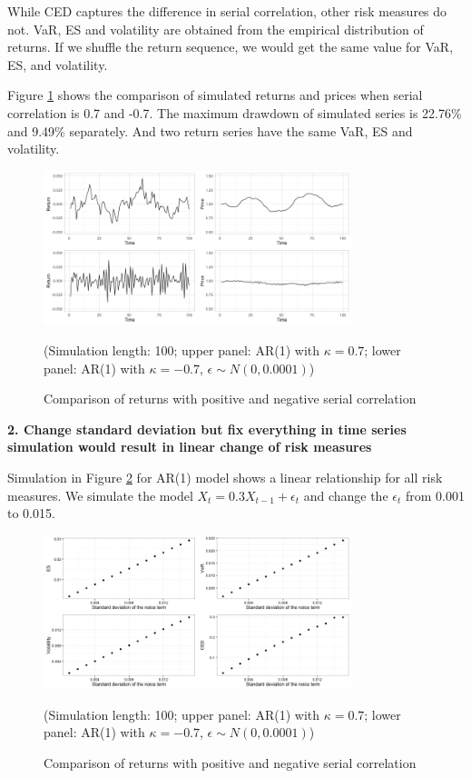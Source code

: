 \documentclass[11pt]{article}
\begin{document}
While CED captures the difference in serial correlation, other risk measures do not. VaR, ES and volatility are obtained from the empirical distribution of returns. If we shuffle the return sequence, we would get the same value for VaR, ES, and volatility.

Figure \ref{fig:Comparison_pos_neg_autocorrelation} shows the comparison of simulated returns and prices when serial correlation is 0.7 and -0.7. The maximum drawdown of simulated series is 22.76\% and 9.49\% separately. And two return series have the same VaR, ES and volatility.

\begin{figure}[H]
\centering
\includegraphics[width = 0.8\textwidth]{../figures/simulation/Comparison_pos_neg_autocorrelation}
\caption{Comparison of returns with positive and negative serial correlation}
(Simulation length: 100; upper panel: AR(1) with $\kappa=0.7$; lower panel: AR(1) with $\kappa=-0.7$, $\epsilon\sim N(0, 0.0001)$)
\label{fig:Comparison_pos_neg_autocorrelation}
\end{figure}

\textbf{2. Change standard deviation but fix everything in time series simulation would result in linear change of risk measures}

Simulation in Figure \ref{fig:change_std_simulation} for AR(1) model shows a linear relationship for all risk measures. We simulate the model $X_t = 0.3X_{t-1} + \epsilon_t$ and change the $\epsilon_t$ from 0.001 to 0.015.

\begin{figure}[H]
\centering
\includegraphics[width = 0.8\textwidth]{../figures/simulation/AR1_risk_measures_change_sd}
\caption{Comparison of returns with positive and negative serial correlation}
(Simulation length: 100; upper panel: AR(1) with $\kappa=0.7$; lower panel: AR(1) with $\kappa=-0.7$, $\epsilon\sim N(0, 0.0001)$)
\label{fig:change_std_simulation}
\end{figure}
\end{document}
